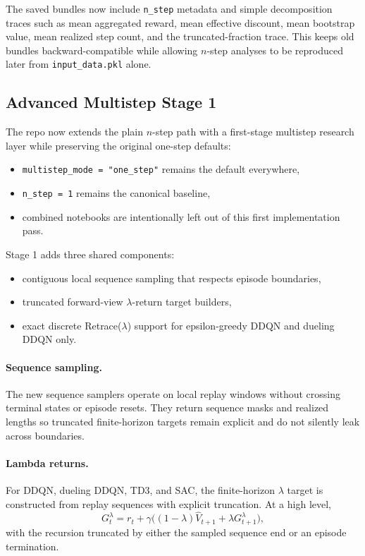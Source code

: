 The saved bundles now include \texttt{n\_step} metadata and simple decomposition traces such as mean aggregated reward, mean effective discount, mean bootstrap value, mean realized step count, and the truncated-fraction trace. This keeps old bundles backward-compatible while allowing $n$-step analyses to be reproduced later from \texttt{input\_data.pkl} alone.

\subsection{Advanced Multistep Stage 1}
The repo now extends the plain $n$-step path with a first-stage multistep research layer while preserving the original one-step defaults:
\begin{itemize}
  \item \texttt{multistep\_mode = "one\_step"} remains the default everywhere,
  \item \texttt{n\_step = 1} remains the canonical baseline,
  \item combined notebooks are intentionally left out of this first implementation pass.
\end{itemize}

Stage 1 adds three shared components:
\begin{itemize}
  \item contiguous local sequence sampling that respects episode boundaries,
  \item truncated forward-view $\lambda$-return target builders,
  \item exact discrete Retrace($\lambda$) support for epsilon-greedy DDQN and dueling DDQN only.
\end{itemize}

\paragraph{Sequence sampling.}
The new sequence samplers operate on local replay windows without crossing terminal states or episode resets. They return sequence masks and realized lengths so truncated finite-horizon targets remain explicit and do not silently leak across boundaries.

\paragraph{Lambda returns.}
For DDQN, dueling DDQN, TD3, and SAC, the finite-horizon $\lambda$ target is constructed from replay sequences with explicit truncation. At a high level,
\[
G_t^{\lambda} = r_t + \gamma \bigl((1-\lambda)\hat V_{t+1} + \lambda G_{t+1}^{\lambda}\bigr),
\]
with the recursion truncated by either the sampled sequence end or an episode termination.

